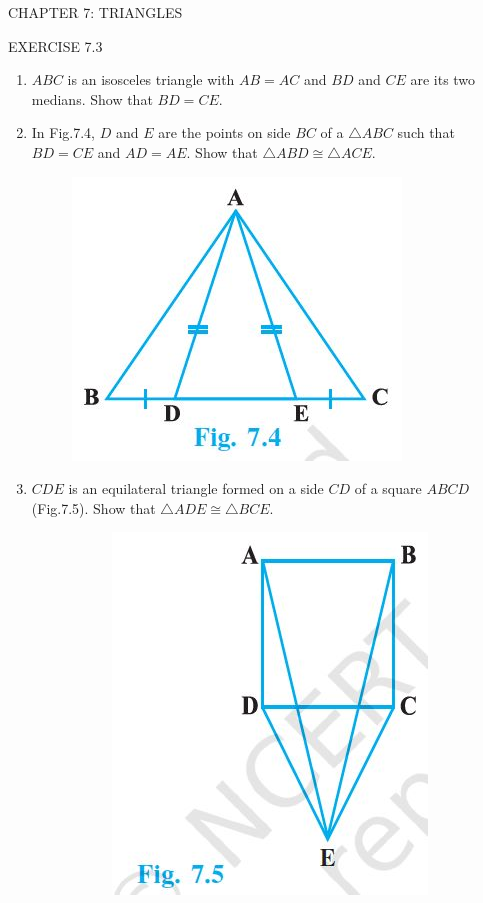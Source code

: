 \documentclass{article}
\begin{document}
\begin{center}
	\color{blue} CHAPTER 7: TRIANGLES
\end{center}
\begin{center}
	\color{blue} EXERCISE 7.3
\end{center}

\begin{enumerate}
\item $ABC$ is an isosceles triangle with $AB=AC$ and $BD$ and $CE$ are its two medians. Show that $BD=CE$.
\item In Fig.7.4, $D$ and $E$ are the points on side $BC$ of a $\triangle ABC$ such that $BD=CE$ and $AD=AE$. Show that $\triangle ABD \cong \triangle ACE$.
\begin{figure}[h]
	\centering
	\includegraphics[scale=0.5]{Figure1}
\end{figure}
\item $CDE$ is an equilateral triangle formed on a side $CD$ of a square $ABCD$ (Fig.7.5). Show that $\triangle ADE \cong \triangle BCE$.
\begin{figure}[h]
	\begin{subfigure}{0.5\textwidth}
		\includegraphics[width=0.9\linewidth,scale=0.5]{Figure2}

\end{subfigure}
\end{figure}
\end{enumerate}
\end{document}

